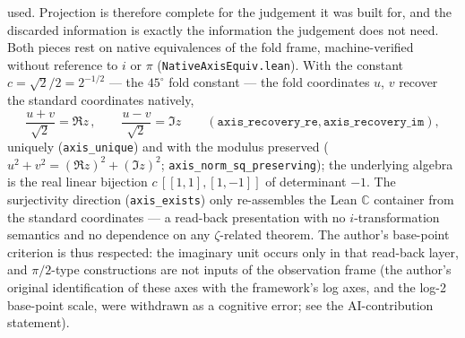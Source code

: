\documentclass{article}
\newcommand{\zt}{\zeta}
\begin{document}
used. Projection is therefore complete for the judgement it was built
for, and the discarded information is exactly the information the
judgement does not need.
Both pieces rest on native equivalences of the fold frame,
machine-verified without reference to $i$ or $\pi$
(\texttt{NativeAxisEquiv.lean}). With the constant
$c=\sqrt2/2=2^{-1/2}$ --- the $45^\circ$ fold constant --- the fold
coordinates $u$, $v$ recover
the standard coordinates natively,
\begin{equation}
  \frac{u+v}{\sqrt2}=\Re z\,,\qquad \frac{u-v}{\sqrt2}=\Im z
  \qquad (\texttt{axis\_recovery\_re}, \texttt{axis\_recovery\_im}),
\end{equation}
uniquely (\texttt{axis\_unique}) and with the modulus preserved
($u^2+v^2=(\Re z)^2+(\Im z)^2$;
\texttt{axis\_norm\_sq\_preserving}); the underlying algebra is the
real linear bijection $c\,[[1,1],[1,-1]]$ of determinant $-1$. The
surjectivity direction (\texttt{axis\_exists}) only re-assembles the
Lean $\mathbb C$ container from the standard coordinates --- a
read-back presentation with no $i$-transformation semantics and no
dependence on any $\zt$-related theorem. The author's base-point
criterion is thus respected: the imaginary unit occurs only in that
read-back layer, and $\pi/2$-type constructions are not inputs of the
observation frame (the author's original identification of these axes
with the framework's log axes, and the log-2 base-point scale, were
withdrawn as a cognitive error; see the AI-contribution statement).
\end{document}
